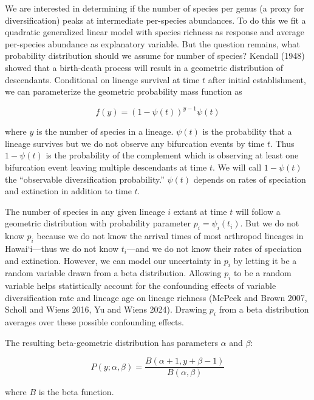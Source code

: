 \documentclass[
  letterpaper,
  DIV=11,
  numbers=noendperiod]{scrartcl}
\begin{document}
We are interested in determining if the number of species per genus (a
proxy for diversification) peaks at intermediate per-species abundances.
To do this we fit a quadratic generalized linear model with species
richness as response and average per-species abundance as explanatory
variable. But the question remains, what probability distribution should
we assume for number of species? Kendall (1948) showed that a
birth-death process will result in a geometric distribution of
descendants. Conditional on lineage survival at time \(t\) after initial
establishment, we can parameterize the geometric probability mass
function as

\begin{equation}
f(y) = (1 - \psi(t))^{y-1}\psi(t)
\end{equation}

where \(y\) is the number of species in a lineage. \(\psi(t)\) is the
probability that a lineage survives but we do not observe any
bifurcation events by time \(t\). Thus \(1 - \psi(t)\) is the
probability of the complement which is observing at least one
bifurcation event leaving multiple descendants at time \(t\). We will
call \(1 - \psi(t)\) the ``observable diversification probability.''
\(\psi(t)\) depends on rates of speciation and extinction in addition to
time \(t\).

The number of species in any given lineage \(i\) extant at time \(t\)
will follow a geometric distribution with probability parameter
\(p_i = \psi_i(t_i)\). But we do not know \(p_i\) because we do not know
the arrival times of most arthropod lineages in Hawai`i---thus we do not
know \(t_i\)---and we do not know their rates of speciation and
extinction. However, we can model our uncertainty in \(p_i\) by letting
it be a random variable drawn from a beta distribution. Allowing \(p_i\)
to be a random variable helps statistically account for the confounding
effects of variable diversification rate and lineage age on lineage
richness (McPeek and Brown 2007, Scholl and Wiens 2016, Yu and Wiens
2024). Drawing \(p_i\) from a beta distribution averages over these
possible confounding effects.

The resulting beta-geometric distribution has parameters \(\alpha\) and
\(\beta\):

\begin{equation}
P(y; \alpha, \beta) = \frac{B(\alpha + 1, y + \beta - 1)}{B(\alpha, \beta)}
\end{equation}

where \(B\) is the beta function.
\end{document}
